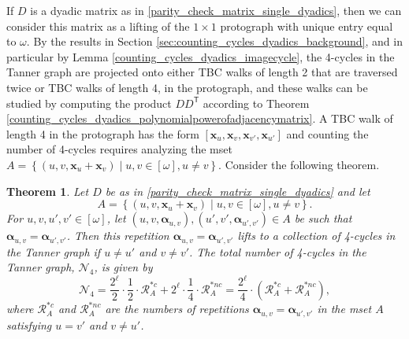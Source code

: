 \documentclass[11pt]{article}
\newtheorem{theorem}[lemma]{Theorem}
\theoremstyle{plain}
\theoremstyle{plain}
\theoremstyle{definition}
\numberwithin{theo}{section}
\newcommand{\bx}{{\mathbf x}}
\newcommand{\balpha}{{\boldsymbol \alpha}}
\newcounter{alp}
\begin{document}
If $D$ is a dyadic matrix as in \eqref{parity_check_matrix_single_dyadics}, then we can consider this matrix as a lifting of the $1\times1$ protograph with unique entry equal to $\omega$. By the results in Section \ref{sec:counting_cycles_dyadics_background}, and in particular by Lemma \ref{counting_cycles_dyadics_imagecycle}, the 4-cycles in the Tanner graph are projected onto either TBC walks of length 2 that are traversed twice or TBC walks of length 4, in the protograph, and these walks can be studied by computing the product $DD^\mathsf{T}$ according to Theorem \ref{counting_cycles_dyadics_polynomialpowerofadjacencymatrix}. A TBC walk of length 4 in the protograph has the form $[\bx_{u},\bx_{v},\bx_{v'},\bx_{u'}]$ and counting the number of 4-cycles requires analyzing the mset $A=\left\{\left(u,v,\bx_u+\bx_{v}\right)\mid u,v\in[\omega],u\neq v\right\}$. Consider the following theorem.
\begin{theorem}
\label{counting_cycles_thm_4cycles_ncxnv_single_dyadics}
Let $D$ be as in \eqref{parity_check_matrix_single_dyadics} and let
\begin{equation*}
A=\left\{\left(u,v,\bx_u+\bx_{v}\right)\mid u,v\in[\omega], u\neq v\right\}.
\end{equation*}
\noindent For $u,v,u',v'\in[\omega]$, let $(u,v,\balpha_{u,v}),(u',v',\balpha_{u',v'})\in A$ be such that $\balpha_{u,v}=\balpha_{u',v'}$. 
Then this repetition $\balpha_{u,v}=\balpha_{u',v'}$ lifts to a collection of 4-cycles in the Tanner graph if $u\neq u'$ and $v\neq v'$. The total number of 4-cycles in the Tanner graph, $\mathcal{N}_4$, is given by
\begin{equation}
\label{counting_cycles_formula_num4cycles_ncxnv_single_dyadics}
\mathcal{N}_4=\frac{2^\ell}{2}\cdot\frac{1}{2}\cdot\mathcal{R}_{A}^{*c}+2^\ell\cdot\frac{1}{4}\cdot\mathcal{R}_{A}^{*nc} = \frac{2^\ell}{4}\cdot\left(\mathcal{R}_{A}^{*c}+\mathcal{R}_{A}^{*nc}\right),
\end{equation}
where $\mathcal{R}_{A}^{*c}$ and $\mathcal{R}_{A}^{*nc}$ are the numbers of repetitions $\balpha_{u,v}=\balpha_{u',v'}$ in the mset $A$ satisfying $u=v'$ and  $v\neq u'$.
\end{theorem}
\end{document}

